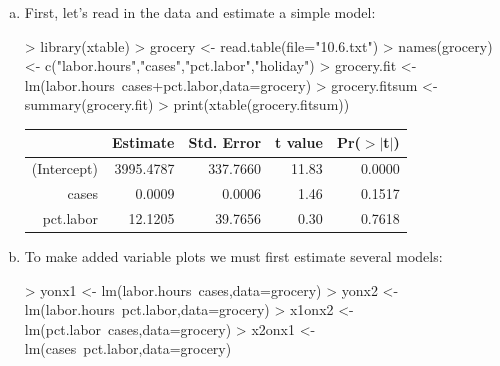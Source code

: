 \documentclass{article}
\begin{document}
\begin{enumerate}[a)]

\item{} First, let's read in the data and estimate a simple model:
\begin{Schunk}
\begin{Sinput}
> library(xtable)
> grocery <- read.table(file="10.6.txt")
> names(grocery) <- c("labor.hours","cases","pct.labor","holiday")
> grocery.fit <- lm(labor.hours~cases+pct.labor,data=grocery)
> grocery.fitsum <- summary(grocery.fit)
> print(xtable(grocery.fitsum))
\end{Sinput}
\begin{table}[ht]
\centering
\begin{tabular}{rrrrr}
  \hline
 & Estimate & Std. Error & t value & Pr($>$$|$t$|$) \\ 
  \hline
(Intercept) & 3995.4787 & 337.7660 & 11.83 & 0.0000 \\ 
  cases & 0.0009 & 0.0006 & 1.46 & 0.1517 \\ 
  pct.labor & 12.1205 & 39.7656 & 0.30 & 0.7618 \\ 
   \hline
\end{tabular}
\end{table}\end{Schunk}

\item{} To make added variable plots we must first estimate several models:
\begin{Schunk}
\begin{Sinput}
> yonx1 <- lm(labor.hours~cases,data=grocery)
> yonx2 <- lm(labor.hours~pct.labor,data=grocery)
> x1onx2 <- lm(pct.labor~cases,data=grocery)
> x2onx1 <- lm(cases~pct.labor,data=grocery)
\end{Sinput}
\end{Schunk}


\end{enumerate}
\end{document}
